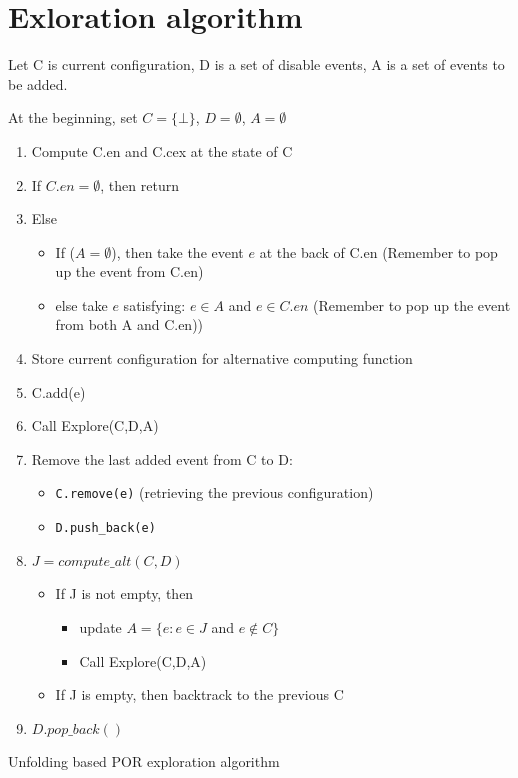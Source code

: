 \documentclass{llncs}
\begin{document}
\section{Exloration algorithm}
\begin{algorithm}
Let C is current configuration, D is a set of disable events, A is a set of events to be added.

At the beginning, set $C = \{\bot \}$, $D = \emptyset$, $A = \emptyset$ 
\begin{enumerate}
	\item
		Compute C.en and C.cex at the state of C
	\item
		If $C.en = \emptyset$, then return
	\item
		Else 
		\begin{itemize}
			\item
				If ($A = \emptyset$), then take the event $e$ at the back of C.en
				(Remember to pop up the event from C.en)
			\item
				else take $e$ satisfying: $e \in A$ and $e \in C.en$
				(Remember to pop up the event from both A and C.en))
		\end{itemize}
	\item
		Store current configuration for alternative computing function
	\item
		C.add(e)
	\item
		Call Explore(C,D,A)
	\item
		Remove the last added event from C to D: 
		\begin{itemize}
		\item
			\verb!C.remove(e)! (retrieving the previous configuration)
		\item
			\verb!D.push_back(e)!
		\end{itemize}
	\item
		$J = compute\_alt(C,D)$
		\begin{itemize}
			\item
				If J is not empty, then
				\begin{itemize}
					\item
						update $A = \{e: e \in J$ and $e\not\in C\}$
					\item
						Call Explore(C,D,A)
				\end{itemize}
			\item
				If J is empty, then backtrack to the previous C
		\end{itemize}
	\item
		$D.pop\_back()$
\end{enumerate}

\caption{Unfolding based POR exploration algorithm}
\label{a:reads}	
\end{algorithm}
\end{document}
